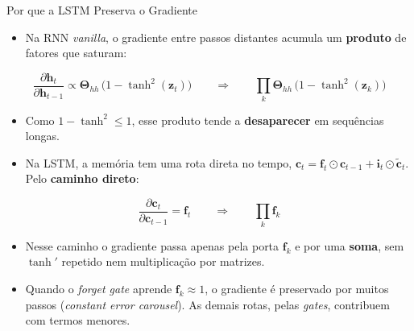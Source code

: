 \documentclass[aspectratio=169,xcolor=dvipsnames]{beamer}
\begin{document}
\begin{frame}{Por que a LSTM Preserva o Gradiente}
\begin{itemize}\small
    \item Na RNN \textit{vanilla}, o gradiente entre passos distantes acumula um \textbf{produto} de fatores que saturam:
\end{itemize}
\[
    \frac{\partial \mathbf{h}_t}{\partial \mathbf{h}_{t-1}} \propto \mathbf{\Theta}_{hh}\,\bigl(1 - \tanh^2(\mathbf{z}_t)\bigr)
    \qquad\Rightarrow\qquad
    \prod_{k} \mathbf{\Theta}_{hh}\,\bigl(1 - \tanh^2(\mathbf{z}_k)\bigr)
\]
\begin{itemize}\small
    \item Como $1 - \tanh^2 \le 1$, esse produto tende a \textbf{desaparecer} em sequências longas.
    \item Na LSTM, a memória tem uma rota direta no tempo, $\mathbf{c}_t = \mathbf{f}_t \odot \mathbf{c}_{t-1} + \mathbf{i}_t \odot \tilde{\mathbf{c}}_t$. Pelo \textbf{caminho direto}:
\end{itemize}
\[
    \frac{\partial \mathbf{c}_t}{\partial \mathbf{c}_{t-1}} = \mathbf{f}_t
    \qquad\Rightarrow\qquad
    \prod_{k} \mathbf{f}_k
\]
\begin{itemize}\footnotesize
    \item Nesse caminho o gradiente passa apenas pela porta $\mathbf{f}_k$ e por uma \textbf{soma}, sem $\tanh'$ repetido nem multiplicação por matrizes.
    \item Quando o \textit{forget gate} aprende $\mathbf{f}_k \approx 1$, o gradiente é preservado por muitos passos (\textit{constant error carousel}). As demais rotas, pelas \textit{gates}, contribuem com termos menores.
\end{itemize}
\end{frame}
\end{document}
